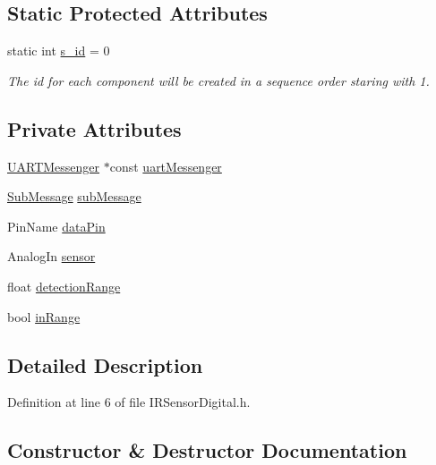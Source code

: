 \subsection*{Static Protected Attributes}
\begin{DoxyCompactItemize}
\item 
static int \hyperlink{class_abstract_component_a99ce3e5fe7d73dac569b874c15fcaf0d}{s\+\_\+id} = 0
\begin{DoxyCompactList}\small\item\em The id for each component will be created in a sequence order staring with 1. \end{DoxyCompactList}\end{DoxyCompactItemize}
\subsection*{Private Attributes}
\begin{DoxyCompactItemize}
\item 
\hyperlink{class_u_a_r_t_messenger}{U\+A\+R\+T\+Messenger} $\ast$const \hyperlink{class_i_r_sensor_digital_a4890a7142a916a4d1ef70d7ebbe79f77}{uart\+Messenger}
\item 
\hyperlink{struct_sub_message}{Sub\+Message} \hyperlink{class_i_r_sensor_digital_a930d64f72308a44d9be143d1eb8c77a1}{sub\+Message}
\item 
Pin\+Name \hyperlink{class_i_r_sensor_digital_a4dcc356ed96053c03b4fd247b9ffc928}{data\+Pin}
\item 
Analog\+In \hyperlink{class_i_r_sensor_digital_a8b0c7fe2d6e9f575d589342648868235}{sensor}
\item 
float \hyperlink{class_i_r_sensor_digital_abb7c9c63c4aa193dd828d0ee56850478}{detection\+Range}
\item 
bool \hyperlink{class_i_r_sensor_digital_abeaf8c370c70ac755170a77c92788c57}{in\+Range}
\end{DoxyCompactItemize}


\subsection{Detailed Description}


Definition at line 6 of file I\+R\+Sensor\+Digital.\+h.



\subsection{Constructor \& Destructor Documentation}
\mbox{\label{class_i_r_sensor_digital_a43d7d836d07616260611d3cef709dff1}} 
